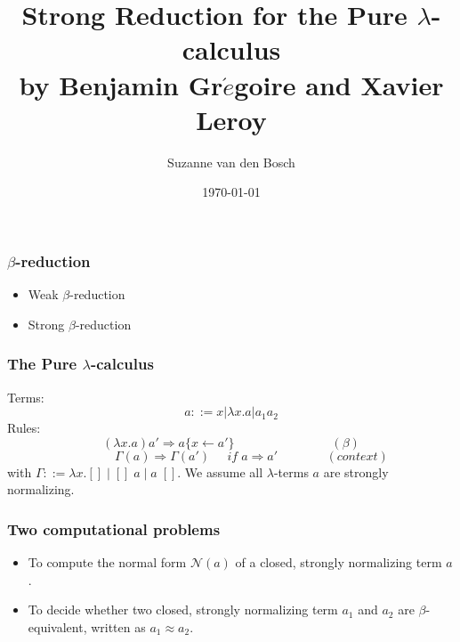\documentclass{beamer}
\title[]{Strong Reduction for the Pure $\lambda$-calculus\\by Benjamin Gr$\acute{e}$goire and Xavier Leroy} %
\author{Suzanne van den Bosch} %
\date{\today} %
\begin{document}
\begin{frame}
\titlepage %
\end{frame}

%
%

%

\begin{frame}
\frametitle{$\beta$-reduction}
\begin{itemize}
\item Weak $\beta$-reduction
\item Strong $\beta$-reduction
\end{itemize}

\end{frame}

\begin{frame}
\frametitle{The Pure $\lambda$-calculus}
Terms:
\begin{equation*}
a ::= x | \lambda x.a | a_1 a_2
\end{equation*}
Rules: 
\begin{equation*}
(\lambda x.a) a'  \Rightarrow a\{x \leftarrow a'\} \;\;\;\;\;\;\;\;\;\;\;\;\;\;\;\;\;\;\;\;\;\;\;\;\;\;\;\;(\beta)
\end{equation*}
\begin{equation*}
\;\;\;\;\;\;\;\;\;\;\;\:\Gamma(a)  \Rightarrow \Gamma (a') \;\;\;\;\; if\; a \Rightarrow a'  \;\;\;\;\;\;\;\;\;\;\;\;\;\; (context)
\end{equation*}
with $\Gamma ::= \lambda x.[] \;|\; []\; a\; |\; a\; [] $.
We assume all $\lambda$-terms $a$ are strongly normalizing.
\end{frame}

\begin{frame}
\frametitle{Two computational problems}
\begin{itemize}
\item To compute the normal form $\mathcal{N}(a)$ of a closed, strongly normalizing term $a$.
\item To decide whether two closed, strongly normalizing term $a_1$ and $a_2$ are $\beta$-equivalent, written as $a_1 \approx a_2$.
\end{itemize}
\end{frame}
\end{document}
